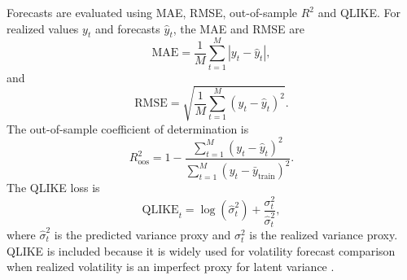 Forecasts are evaluated using MAE, RMSE, out-of-sample $R^2$ and QLIKE. For realized values $y_t$ and forecasts $\hat{y}_t$, the MAE and RMSE are
\begin{equation}
\mathrm{MAE}
=
\frac{1}{M}
\sum_{t=1}^{M}
|y_t-\hat{y}_t|,
\end{equation}
and
\begin{equation}
\mathrm{RMSE}
=
\sqrt{
\frac{1}{M}
\sum_{t=1}^{M}
(y_t-\hat{y}_t)^2
}.
\end{equation}
The out-of-sample coefficient of determination is
\begin{equation}
R_{\mathrm{oos}}^{2}
=
1
-
\frac{
\sum_{t=1}^{M}
(y_t-\hat{y}_t)^2
}{
\sum_{t=1}^{M}
(y_t-\bar{y}_{\mathrm{train}})^2
}.
\end{equation}
The QLIKE loss is
\begin{equation}
\mathrm{QLIKE}_t
=
\log(\hat{\sigma}_t^2)
+
\frac{\sigma_t^2}{\hat{\sigma}_t^2},
\end{equation}
where $\hat{\sigma}_t^2$ is the predicted variance proxy and $\sigma_t^2$ is the realized variance proxy. QLIKE is included because it is widely used for volatility forecast comparison when realized volatility is an imperfect proxy for latent variance \cite{patton_2011_volatility}.
